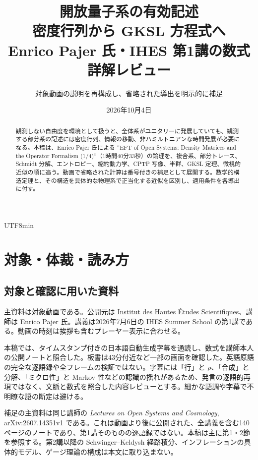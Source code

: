 \documentclass[11pt,a4paper]{article}
\numberwithin{equation}{section}
\begin{document}
\begin{CJK*}{UTF8}{min}
\renewcommand{\contentsname}{目次}
\renewcommand{\refname}{参考文献と閲覧範囲}
\title{開放量子系の有効記述\\密度行列から GKSL 方程式へ\\\large Enrico Pajer 氏・IHES 第1講の数式詳解レビュー}
\author{対象動画の説明を再構成し、省略された導出を明示的に補足}
\date{2026年10月4日}
\maketitle
\begin{abstract}
観測しない自由度を環境として扱うと、全体系がユニタリーに発展していても、観測する部分系の記述には密度行列、情報の移動、非ハミルトニアンな時間発展が必要になる。本稿は、Enrico Pajer 氏による ``EFT of Open Systems: Density Matrices and the Operator Formalism (1/4)''（1時間40分33秒）の論理を、複合系、部分トレース、Schmidt 分解、エントロピー、縮約動力学、CPTP 写像、半群、GKSL 定理、微視的近似の順に追う。動画で省略された計算は番号付きの補足として展開する。数学的構造定理と、その構造を具体的な物理系で正当化する近似を区別し、適用条件を各導出に付す。
\end{abstract}
\tableofcontents
\clearpage

\section{対象・体裁・読み方}
\label{sec:editorial}
\subsection{対象と確認に用いた資料}
主資料は\href{https://www.youtube.com/watch?v=3gDSaNy1O7Y}{対象動画}\cite{video}である。公開元は Institut des Hautes Études Scientifiques、講師は Enrico Pajer 氏。講義は2026年7月6日の IHES Summer School の第1講である。動画の時刻は挨拶も含むプレーヤー表示に合わせる。

本稿では、タイムスタンプ付きの日本語自動生成字幕を通読し、数式を講師本人の公開ノート\cite{pajer}と照合した。板書は43分付近など一部の画面を確認した。英語原語の完全な逐語録や全フレームの検証ではない。字幕には「行」と $\rho$、「合成」と分解、「ミクロ性」と Markov 性などの認識の揺れがあるため、発言の逐語的再現ではなく、文脈と数式を照合した内容レビューとする。細かな語調や字幕で不明瞭な語の断定は避ける。

補足の主資料は同じ講師の \emph{Lectures on Open Systems and Cosmology}, arXiv:2607.14351v1 である。これは動画より後に公開された、全講義を含む140ページのノートであり、第1講そのものの逐語録ではない。本稿は主に第1・2節を参照する。第2講以降の Schwinger--Keldysh 経路積分、インフレーションの具体的モデル、ゲージ理論の構成は本文に取り込まない。


\end{CJK*}
\end{document}
